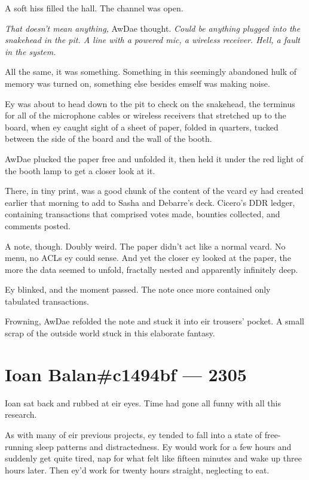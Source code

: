 A soft hiss filled the hall. The channel was open.

\emph{That doesn't mean anything,} AwDae thought. \emph{Could be anything plugged into the snakehead in the pit. A line with a powered mic, a wireless receiver. Hell, a fault in the system.}

All the same, it was something. Something in this seemingly abandoned hulk of memory was turned on, something else besides emself was making noise.

Ey was about to head down to the pit to check on the snakehead, the terminus for all of the microphone cables or wireless receivers that stretched up to the board, when ey caught sight of a sheet of paper, folded in quarters, tucked between the side of the board and the wall of the booth.

AwDae plucked the paper free and unfolded it, then held it under the red light of the booth lamp to get a closer look at it.

There, in tiny print, was a good chunk of the content of the vcard ey had created earlier that morning to add to Sasha and Debarre's deck. Cicero's DDR ledger, containing transactions that comprised votes made, bounties collected, and comments posted.

A note, though. Doubly weird. The paper didn't act like a normal vcard. No menu, no ACLs ey could sense. And yet the closer ey looked at the paper, the more the data seemed to unfold, fractally nested and apparently infinitely deep.

Ey blinked, and the moment passed. The note once more contained only tabulated transactions.

Frowning, AwDae refolded the note and stuck it into eir trousers' pocket. A small scrap of the outside world stuck in this elaborate fantasy.

\chapter*{Ioan Balan\#c1494bf — 2305}

Ioan sat back and rubbed at eir eyes. Time had gone all funny with all this research.

As with many of eir previous projects, ey tended to fall into a state of free-running sleep patterns and distractedness. Ey would work for a few hours and suddenly get quite tired, nap for what felt like fifteen minutes and wake up three hours later. Then ey'd work for twenty hours straight, neglecting to eat.

